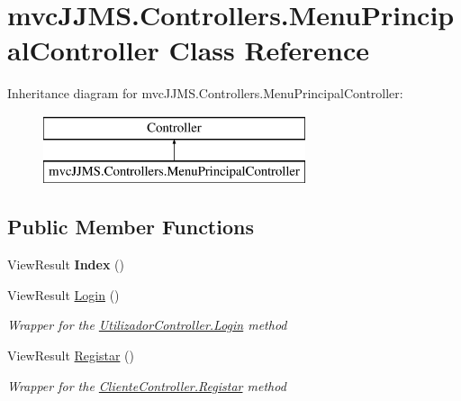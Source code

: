 \hypertarget{classmvc_j_j_m_s_1_1_controllers_1_1_menu_principal_controller}{}\section{mvc\+J\+J\+M\+S.\+Controllers.\+Menu\+Principal\+Controller Class Reference}
\label{classmvc_j_j_m_s_1_1_controllers_1_1_menu_principal_controller}
Inheritance diagram for mvc\+J\+J\+M\+S.\+Controllers.\+Menu\+Principal\+Controller\+:\begin{figure}[H]
\begin{center}
\leavevmode
\includegraphics[height=2.000000cm]{classmvc_j_j_m_s_1_1_controllers_1_1_menu_principal_controller}
\end{center}
\end{figure}
\subsection*{Public Member Functions}
\begin{DoxyCompactItemize}
\item 
\mbox{\label{classmvc_j_j_m_s_1_1_controllers_1_1_menu_principal_controller_a0e17d9e86a0a271c794b05910ab17af8}} 
View\+Result {\bfseries Index} ()
\item 
View\+Result \mbox{\hyperlink{classmvc_j_j_m_s_1_1_controllers_1_1_menu_principal_controller_aaa09d4cb83794cb17bdb5f9c7dffdd3d}{Login}} ()
\begin{DoxyCompactList}\small\item\em Wrapper for the \mbox{\hyperlink{classmvc_j_j_m_s_1_1_controllers_1_1_utilizador_controller_af8335bb74fe7e7b4cbab85a176775c30}{Utilizador\+Controller.\+Login}} method \end{DoxyCompactList}\item 
View\+Result \mbox{\hyperlink{classmvc_j_j_m_s_1_1_controllers_1_1_menu_principal_controller_a3ca7f041e21c6d3c633e255d96785d52}{Registar}} ()
\begin{DoxyCompactList}\small\item\em Wrapper for the \mbox{\hyperlink{classmvc_j_j_m_s_1_1_controllers_1_1_cliente_controller_a31325ea0231ffa6f09996a9f61f1731b}{Cliente\+Controller.\+Registar}} method \end{DoxyCompactList}\end{DoxyCompactItemize}


